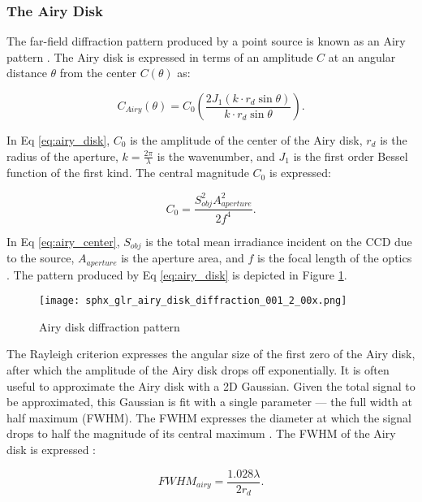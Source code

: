 \subsubsection{The Airy Disk}

The far-field diffraction pattern produced by a point source is known as an Airy pattern \cite{frueh2019notes}. The Airy disk is expressed in terms of an amplitude $C$ at an angular distance $\theta$ from the center $C(\theta)$ as:

\begin{equation} \label{eq:airy_disk}
  C_{Airy}(\theta) = C_0 \left( \frac{2 J_1(k \cdot r_d \sin\theta)}{k \cdot r_d \sin\theta} \right).
\end{equation}

In Eq \ref{eq:airy_disk}, $C_0$ is the amplitude of the center of the Airy disk, $r_d$ is the radius of the aperture, $k = \frac{2\pi}{\lambda}$ is the wavenumber, and $J_1$ is the first order Bessel function of the first kind. The central magnitude $C_0$ is expressed:

\begin{equation} \label{eq:airy_center}
  C_0 = \frac{S_{obj}^2 A_{aperture}^2}{2 f^4}.
\end{equation}

In Eq \ref{eq:airy_center}, $S_{obj}$ is the total mean irradiance incident on the CCD due to the source, $A_{aperture}$ is the aperture area, and $f$ is the focal length of the optics \cite{frueh2019notes}. The pattern produced by Eq \ref{eq:airy_disk} is depicted in Figure \ref{fig:airy_disk_magnitude}.

\begin{figure}[ht]
  \centering
  \texttt{[image: sphx\_glr\_airy\_disk\_diffraction\_001\_2\_00x.png]}
  \caption{Airy disk diffraction pattern}
  \label{fig:airy_disk_magnitude}
\end{figure}

The Rayleigh criterion expresses the angular size of the first zero of the Airy disk, after which the amplitude of the Airy disk drops off exponentially. It is often useful to approximate the Airy disk with a 2D Gaussian. Given the total signal to be approximated, this Gaussian is fit with a single parameter --- the full width at half maximum (FWHM). The FWHM expresses the diameter at which the signal drops to half the magnitude of its central maximum \cite{frueh2019notes}. The FWHM of the Airy disk is expressed \cite{frueh2019notes}:

\begin{equation} \label{eq:fwhm_airy}
  FWHM_{airy} = \frac{1.028 \lambda}{2 r_d}.
\end{equation}

